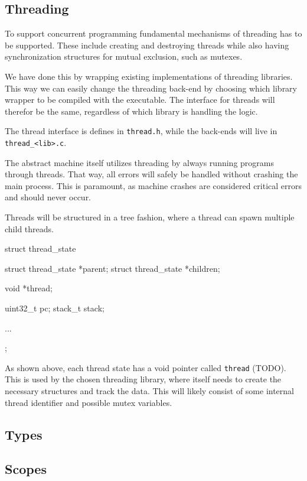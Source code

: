 \subsection{Threading}

To support concurrent programming fundamental mechanisms of threading has to be
supported. These include creating and destroying threads while also having
synchronization structures for mutual exclusion, such as mutexes.

We have done this by wrapping existing implementations of threading libraries.
This way we can easily change the threading back-end by choosing which library
wrapper to be compiled with the executable. The interface for threads will
therefor be the same, regardless of which library is handling the logic.

The thread interface is defines in {\tt thread.h}, while the back-ends will live
in {\tt thread\_<lib>.c}.

The abstract machine itself utilizes threading by always running programs
through threads. That way, all errors will safely be handled without crashing
the main process. This is paramount, as machine crashes are considered critical
errors and should never occur.

Threads will be structured in a tree fashion, where a thread can spawn multiple
child threads.
\begin{ccode}
struct thread_state {
    struct thread_state *parent;
    struct thread_state *children;

    void *thread;

    uint32_t pc;
    stack_t stack;

    ...
};
\end{ccode}

As shown above, each thread state has a void pointer called {\tt thread}
(TODO). This is used by the chosen threading library, where itself needs to
create the necessary structures and track the data. This will likely consist of
some internal thread identifier and possible mutex variables.

\subsection{Types}

\subsection{Scopes}

